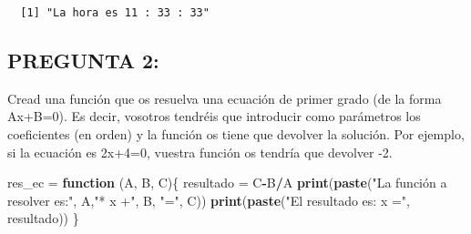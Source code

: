 \documentclass[]{article}
\newenvironment{Shaded}{\begin{snugshade}}{\end{snugshade}}
\newcommand{\ControlFlowTok}[1]{\textcolor[rgb]{0.13,0.29,0.53}{\textbf{#1}}}
\newcommand{\DecValTok}[1]{\textcolor[rgb]{0.00,0.00,0.81}{#1}}
\newcommand{\KeywordTok}[1]{\textcolor[rgb]{0.13,0.29,0.53}{\textbf{#1}}}
\newcommand{\NormalTok}[1]{#1}
\newcommand{\OperatorTok}[1]{\textcolor[rgb]{0.81,0.36,0.00}{\textbf{#1}}}
\newcommand{\StringTok}[1]{\textcolor[rgb]{0.31,0.60,0.02}{#1}}
\begin{document}
\begin{Shaded}
\end{Shaded}

\begin{verbatim}
  [1] "La hora es 11 : 33 : 33"
\end{verbatim}

\hypertarget{pregunta-2}{%
\subsection{PREGUNTA 2:}\label{pregunta-2}}

Cread una función que os resuelva una ecuación de primer grado (de la
forma Ax+B=0). Es decir, vosotros tendréis que introducir como
parámetros los coeficientes (en orden) y la función os tiene que
devolver la solución. Por ejemplo, si la ecuación es 2x+4=0, vuestra
función os tendría que devolver -2.

\begin{Shaded}
\begin{Highlighting}[]
\NormalTok{res_ec =}\StringTok{ }\ControlFlowTok{function}\NormalTok{ (A, B, C)\{}
\NormalTok{  resultado =}\StringTok{ }\NormalTok{C}\OperatorTok{-}\NormalTok{B}\OperatorTok{/}\NormalTok{A}
  \KeywordTok{print}\NormalTok{(}\KeywordTok{paste}\NormalTok{(}\StringTok{"La función a resolver es:"}\NormalTok{, A,}\StringTok{"* x +"}\NormalTok{, B, }\StringTok{"="}\NormalTok{, C))}
  \KeywordTok{print}\NormalTok{(}\KeywordTok{paste}\NormalTok{(}\StringTok{"El resultado es: x ="}\NormalTok{, resultado))}
\NormalTok{\}}
\end{Highlighting}
\end{Shaded}
\end{document}
